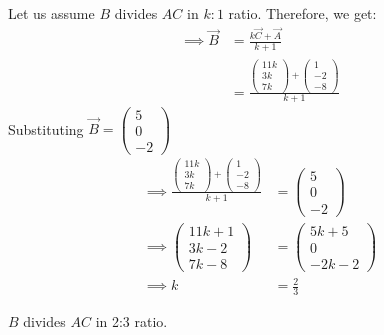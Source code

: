 \documentclass[12pt]{article}
\newcommand{\myvec}[1]{\ensuremath{\begin{pmatrix}#1\end{pmatrix}}}
\begin{document}
\begin{enumerate}
Let us assume $B$ divides $AC$ in $k:1$ ratio. Therefore, we get:
\begin{align}
    \implies \Vec{B} &= \frac{k\Vec{C}+\Vec{A}}{k+1}\\
    \label{eq:5}
    &= \frac{\myvec{11k \\ 3k \\ 7k} + \myvec{1 \\ -2 \\ -8}}{k+1}
    \label{eq:6}
\end{align}
Substituting $\Vec{B} = \myvec{5 \\ 0 \\ -2}$
\begin{align}
    \implies \frac{\myvec{11k \\ 3k \\ 7k} + \myvec{1 \\ -2 \\ -8}}{k+1} &= \myvec{5 \\ 0 \\ -2}\\
    \label{eq:7}
     \implies \myvec{11k+1 \\ 3k-2 \\ 7k-8} &= \myvec{5k+5 \\ 0 \\ -2k-2}\\
    \label{eq:8}
    \implies k &= \frac{2}{3}
    \label{eq:9}
\end{align}

$B$ divides $AC$ in 2:3 ratio.

\end{enumerate}
\end{document}
